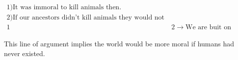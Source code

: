 \documentclass[12pt]{report}
\numberwithin{equation}{section}
\begin{document}
\begin{align}
1) \text{It was immoral to kill animals then.} \\
2) \text{If our ancestors didn't kill animals they would not have evolved as they did} \\
1&2 \rightarrow \text{We are buit on immorality}
\end{align}

This line of argument implies the world would be more moral if humans had never existed. 




 


\end{document}
